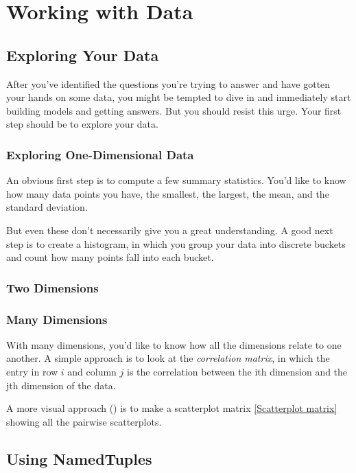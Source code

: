 \chapter{Working with Data}
\section{Exploring Your Data}
After you've identified the questions you're trying to answer and have gotten your
hands on some data, you might be tempted to dive in and immediately start building
models and getting answers. But you should resist this urge. Your first step should be
to explore your data.
\subsection{Exploring One-Dimensional Data}
An obvious first step is to compute a few summary statistics. You'd like to know how
many data points you have, the smallest, the largest, the mean, and the standard deviation.

But even these don't necessarily give you a great understanding. A good next step is to
create a histogram, in which you group your data into discrete buckets and count how
many points fall into each bucket.

\subsection{Two Dimensions}
\subsection{Many Dimensions}
With many dimensions, you'd like to know how all the dimensions relate to one
another. A simple approach is to look at the \emph{correlation matrix}, in which the entry in
row $i$ and column $j$ is the correlation between the ith dimension and the jth dimension of the data.


A more visual approach () is to make a scatterplot matrix \autoref{Scatterplot matrix} showing all the pairwise scatterplots.


\section{Using NamedTuples}